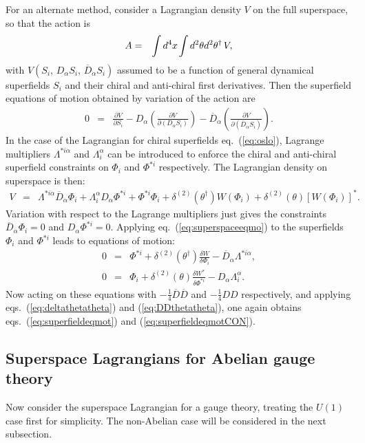 \documentclass[12pt]{article}
\def\beq{\begin{eqnarray}}
\def\eeq{\end{eqnarray}}
\def\Dcon{\overline D}
\begin{document}
For an alternate method, consider a Lagrangian density $V$ on 
the full superspace, so that the action is
\beq
A &=& \int d^4 x \hspace{-0.5pt} \int d^2\theta d^2\theta^\dagger\, V,
\eeq
with $V(S_i, \, D_\alpha S_i, \, \Dcon_{\dot\alpha} S_i)$ assumed to be
a function of 
general dynamical superfields $S_i$ and their chiral and anti-chiral 
first derivatives. Then the superfield equations of motion obtained by 
variation of the action are
\beq
0 &=& \frac{\partial V}{\partial S_i}
- D_\alpha \left ( \frac{\partial V}{\partial (D_\alpha S_i)} 
\right ) 
- \Dcon_{\dot\alpha} \left (\frac{\partial V}{\partial 
(\Dcon_{\dot\alpha} S_i)} \right )
.
\label{eq:superspaceeqmo}
\eeq
In the case of the Lagrangian for chiral superfields eq.~(\ref{eq:oslo}), 
Lagrange multipliers 
$\Lambda^{*i\dot \alpha}$ and $\Lambda^{\alpha}_i$ can be introduced
to enforce the chiral and anti-chiral superfield constraints 
on $\Phi_i$ and $\Phi^{*i}$ respectively. 
The Lagrangian density on superspace is then:
\beq
V &=& 
\Lambda^{*i\dot \alpha} \Dcon_{\dot \alpha} \Phi_i
+ \Lambda^{\alpha}_i D_{\alpha} \Phi^{*i}
+ \Phi^{*i} \Phi_i 
+ \delta^{(2)}(\theta^\dagger) W(\Phi_i)
+ \delta^{(2)}(\theta) [W(\Phi_i)]^* .
\eeq
Variation with respect to the Lagrange multipliers just gives the 
constraints
$\Dcon_{\dot \alpha} \Phi_i = 0$ and
$D_{\alpha} \Phi^{*i} = 0$. Applying eq.~(\ref{eq:superspaceeqmo}) to the 
superfields $\Phi_i$ and $\Phi^{*i}$ leads to equations of motion:
\beq
0 &=&  
\Phi^{*i} +
\delta^{(2)}(\theta^\dagger) \frac{\delta W}{\delta \Phi_i}
- \Dcon_{\dot\alpha} \Lambda^{*i\dot \alpha},
\\
0 &=& 
\Phi_{i} +
\delta^{(2)}(\theta) \frac{\delta W^*}{\delta \Phi^{*i}}
- D_{\alpha} \Lambda^{\alpha}_i 
.
\eeq
Now acting on these equations 
with $-\frac{1}{4} \Dcon\Dcon$ and
$-\frac{1}{4} DD$ respectively, and applying 
eqs.~(\ref{eq:deltathetatheta}) and (\ref{eq:DDthetatheta}),
one again obtains eqs.~(\ref{eq:superfieldeqmot}) and (\ref{eq:superfieldeqmotCON}).

\subsection{Superspace Lagrangians for Abelian 
gauge theory\label{subsec:superspacelagrabelian}}
\setcounter{equation}{0}
\setcounter{footnote}{2}

Now consider the superspace Lagrangian for a gauge theory, treating the 
$U(1)$ case first for simplicity. The non-Abelian case will be considered 
in the next subsection.
\end{document}
